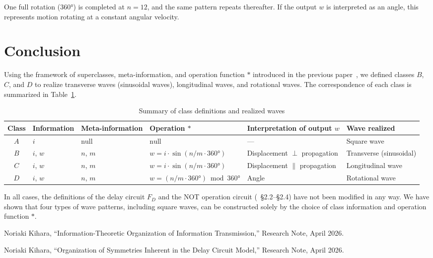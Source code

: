 \documentclass[12pt,a4paper]{article}
\begin{document}
One full rotation ($360°$) is completed at $n = 12$, and the same pattern repeats thereafter.
If the output $w$ is interpreted as an angle, this represents motion rotating at a constant
angular velocity.

\section{Conclusion}

Using the framework of superclasses, meta-information, and operation function $*$ introduced
in the previous paper~\cite{ref2}, we defined classes $B$, $C$, and $D$ to realize transverse
waves (sinusoidal waves), longitudinal waves, and rotational waves. The correspondence of each
class is summarized in Table~\ref{tab:summary}.

\begin{table}[h]
  \centering
  \caption{Summary of class definitions and realized waves}
  \label{tab:summary}
  \begin{tabular}{clllll}
    \toprule
    Class & Information & Meta-information & Operation $*$ &
      Interpretation of output $w$ & Wave realized \\
    \midrule
    $A$ & $i$ & $\mathrm{null}$ & $\mathrm{null}$ &
      --- & Square wave \\
    $B$ & $i$, $w$ & $n$, $m$ & $w = i\cdot\sin(n/m\cdot360°)$ &
      Displacement $\perp$ propagation & Transverse (sinusoidal) \\
    $C$ & $i$, $w$ & $n$, $m$ & $w = i\cdot\sin(n/m\cdot360°)$ &
      Displacement $\parallel$ propagation & Longitudinal wave \\
    $D$ & $i$, $w$ & $n$, $m$ & $w = (n/m\cdot360°)\bmod360°$ &
      Angle & Rotational wave \\
    \bottomrule
  \end{tabular}
\end{table}

In all cases, the definitions of the delay circuit $F_D$ and the NOT operation
circuit (\cite{ref1}~\S2.2--\S2.4) have not been modified in any way. We have shown that four
types of wave patterns, including square waves, can be constructed solely by the choice of
class information and operation function $*$.

\begin{thebibliography}{9}

Noriaki Kihara,
``Information-Theoretic Organization of Information Transmission,''
Research Note, April 2026.

Noriaki Kihara,
``Organization of Symmetries Inherent in the Delay Circuit Model,''
Research Note, April 2026.

\end{thebibliography}
\end{document}
